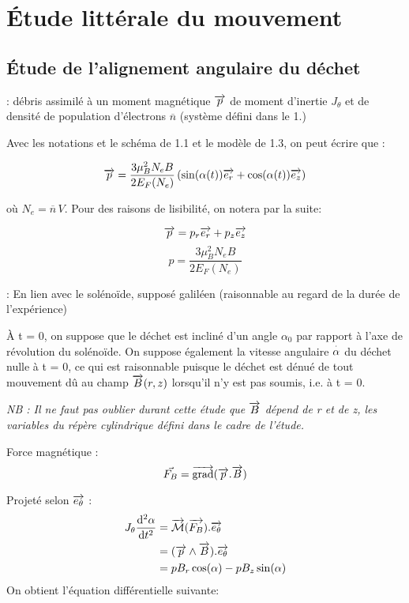 \section{Étude littérale du mouvement}
\subsection{Étude de l'alignement angulaire du déchet}

: {débris assimilé à un moment magnétique $\overrightarrow{p}$ de moment d'inertie $J_\theta$ et de densité de population d'électrons $\overline{n}$ (système défini dans le 1.)}

Avec les notations et le schéma de 1.1 et le modèle de 1.3, on peut écrire que :

$$\overrightarrow{p} = \frac{3\mu_B^2 N_e B}{2 E_F(N_e)} \left(\sin(\alpha(t)) \overrightarrow{e_r} + \cos(\alpha(t)) \overrightarrow{e_z}\right) $$

où $N_e = \overline{n}\, V$. Pour des raisons de lisibilité, on notera par la suite:

$$\overrightarrow{p} = p_r \overrightarrow{e_r} + p_z \overrightarrow{e_z}$$
$$p = \frac{3\mu_B^2 N_e B}{2 E_F(N_e)}$$

: En lien avec le solénoïde, supposé galiléen (raisonnable au regard de la durée de l'expérience)


À t = 0, on suppose que le déchet est incliné d'un angle $\alpha_0$ par rapport à l'axe de révolution du solénoïde. On suppose également la vitesse angulaire $\overset{\cdot}{\alpha}$ du déchet nulle à t = 0, ce qui est raisonnable puisque le déchet est dénué de tout mouvement dû au champ $\overrightarrow{B}(r,z)$ lorsqu'il n'y est pas soumis, i.e. à t = 0.


\emph{NB : Il ne faut pas oublier durant cette étude que $\overrightarrow{B}$ dépend de r et de z, les variables du répère cylindrique défini dans le cadre de l'étude.}

Force magnétique :
$$\vec{F_B} = \overrightarrow{\text{grad}}(\overrightarrow{p}.\overrightarrow{B})$$


Projeté selon $\overrightarrow{e_\theta}$ :
\begin{align*}
J_\theta \frac{\mathrm{d^2}\alpha}{\mathrm{d}t^2} &= \overrightarrow{\mathcal{M}}(\overrightarrow{F_B}) . \overrightarrow{e_\theta} \\
&= (\overrightarrow{p} \wedge \overrightarrow{B}).\overrightarrow{e_\theta}\\
&= pB_r \cos(\alpha) - pB_z\sin(\alpha)
\end{align*}
\newpage
On obtient l'équation différentielle suivante:

